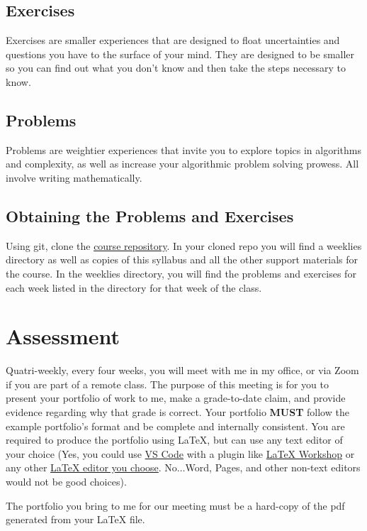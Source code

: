 \documentclass[12pt]{amsart}
\begin{document}
\subsection{Exercises} Exercises are smaller experiences that are designed to float uncertainties and questions you have to the surface of your mind. They are designed to be smaller so you can find out what you don't know and then take the steps necessary to know.
\subsection{Problems} Problems are weightier experiences that invite you to explore topics in algorithms and complexity, as well as increase your algorithmic problem solving prowess. All involve writing mathematically.
\subsection{Obtaining the Problems and Exercises} Using git, clone the \href{https://github.com/byui-cse/cse381-course}{course repository}. In your cloned repo you will find a weeklies directory as well as copies of this syllabus and all the other support materials for the course. In the weeklies directory, you will find the problems and exercises for each week listed in the directory for that week of the class.

\section{Assessment} Quatri-weekly, every four weeks, you will meet with me in my office, or via Zoom if you are part of a remote class. The purpose of this meeting is for you to present your portfolio of work to me, make a grade-to-date claim, and provide evidence regarding why that grade is correct. Your portfolio \textbf{MUST} follow the example portfolio's format and be complete and internally consistent. You are required to produce the portfolio using \LaTeX, but can use any text editor of your choice (Yes, you could use \href{https://code.visualstudio.com/download}{VS Code}  with a plugin like \href{https://marketplace.visualstudio.com/items?itemName=James-Yu.latex-workshop}{\LaTeX{} Workshop}  or any other \href{https://www.google.com/search?q=Best LaTex Editor}{\LaTeX{}  editor you choose}. No$\ldots$Word, Pages, and other non-text editors would not be good choices).

The portfolio you bring to me for our meeting must be a hard-copy of the pdf generated from your \LaTeX{} file.
\end{document}
